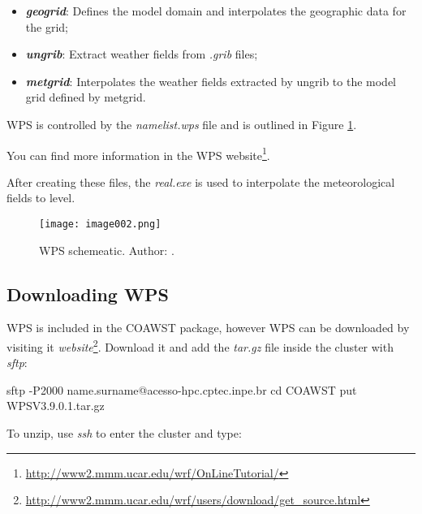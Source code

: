 \begin{itemize}
\item \textbf{\textit{geogrid}}: Defines the model domain and interpolates the geographic data for the grid;
\item \textbf{\textit{ungrib}}: Extract weather fields from \textit{.grib} files;
\item \textbf{\textit{metgrid}}: Interpolates the weather fields extracted by ungrib to the model grid defined by metgrid.
\end{itemize}
\bigskip

\noindent WPS is controlled by the \textit{namelist.wps} file and is outlined in Figure \textcolor{bleu_cite}{\ref{wpsdetalha}}.
\bigskip

\noindent You can find more information in the WPS 
website\textcolor{bleu_cite}{\textit{}\footnote{\textcolor{bleu_cite}{\href{http://www2.mmm.ucar.edu/wrf/OnLineTutorial/}{http://www2.mmm.ucar.edu/wrf/OnLineTutorial/}}}}.
\bigskip

\noindent After creating these files, the \textit{real.exe} is used to interpolate the meteorological fields to \texteta level.
\bigskip

\begin{figure}[H]
    \centering
    \texttt{[image: image002.png]}
    \caption{WPS schemeatic. \newline Author: \textcite{duda2006}.}
    \label{wpsdetalha}
\end{figure}
\bigskip

\subsection{Downloading WPS}
\bigskip

\noindent WPS is included in the COAWST package, however WPS can be downloaded by visiting it
\textcolor{bleu_cite}{\textit{website}\footnote{\textcolor{bleu_cite}{\href{http://www2.mmm.ucar.edu/wrf/users/download/get\_source.html}{http://www2.mmm.ucar.edu/wrf/users/download/get\_source.html}}}}. 
Download it and add the \textit{tar.gz} file inside the cluster with \textit{sftp}:
\bigskip

\begin{bashcode}
sftp -P2000 name.surname@acesso-hpc.cptec.inpe.br
cd COAWST
put WPSV3.9.0.1.tar.gz
\end{bashcode}
\bigskip

\noindent To unzip, use \textit{ssh} to enter the cluster and type:
\bigskip

